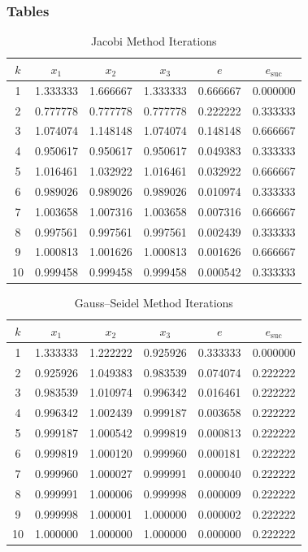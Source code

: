 \documentclass{article}
\begin{document}
\subsubsection*{Tables}

\begin{table}[htbp]
\centering
\caption{Jacobi Method Iterations}
\label{tab:jacobi}
\begin{tabular}{|c c c c c c|}
\toprule
$k$ & $x_1$ & $x_2$ & $x_3$ & $e$ & $e_{\text{suc}}$ \\
\midrule
1  & 1.333333 & 1.666667 & 1.333333 & 0.666667 & 0.000000 \\
2  & 0.777778 & 0.777778 & 0.777778 & 0.222222 & 0.333333 \\
3  & 1.074074 & 1.148148 & 1.074074 & 0.148148 & 0.666667 \\
4  & 0.950617 & 0.950617 & 0.950617 & 0.049383 & 0.333333 \\
5  & 1.016461 & 1.032922 & 1.016461 & 0.032922 & 0.666667 \\
6  & 0.989026 & 0.989026 & 0.989026 & 0.010974 & 0.333333 \\
7  & 1.003658 & 1.007316 & 1.003658 & 0.007316 & 0.666667 \\
8  & 0.997561 & 0.997561 & 0.997561 & 0.002439 & 0.333333 \\
9  & 1.000813 & 1.001626 & 1.000813 & 0.001626 & 0.666667 \\
10 & 0.999458 & 0.999458 & 0.999458 & 0.000542 & 0.333333 \\
\bottomrule
\end{tabular}
\end{table}

\begin{table}[htbp]
\centering
\caption{Gauss--Seidel Method Iterations}
\label{tab:gs}
\begin{tabular}{|c c c c c c|}
\toprule
$k$ & $x_1$ & $x_2$ & $x_3$ & $e$ & $e_{\text{suc}}$ \\
\midrule
1  & 1.333333 & 1.222222 & 0.925926 & 0.333333 & 0.000000 \\
2  & 0.925926 & 1.049383 & 0.983539 & 0.074074 & 0.222222 \\
3  & 0.983539 & 1.010974 & 0.996342 & 0.016461 & 0.222222 \\
4  & 0.996342 & 1.002439 & 0.999187 & 0.003658 & 0.222222 \\
5  & 0.999187 & 1.000542 & 0.999819 & 0.000813 & 0.222222 \\
6  & 0.999819 & 1.000120 & 0.999960 & 0.000181 & 0.222222 \\
7  & 0.999960 & 1.000027 & 0.999991 & 0.000040 & 0.222222 \\
8  & 0.999991 & 1.000006 & 0.999998 & 0.000009 & 0.222222 \\
9  & 0.999998 & 1.000001 & 1.000000 & 0.000002 & 0.222222 \\
10 & 1.000000 & 1.000000 & 1.000000 & 0.000000 & 0.222222 \\
\bottomrule
\end{tabular}
\end{table}
\end{document}
